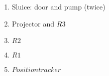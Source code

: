 
\begin{enumerate}
 \item Sluice: door and pump (twice)
 \item Projector and $R3$
 \item $R2$
 \item $R1$
 \item $Position tracker$
\end{enumerate}
